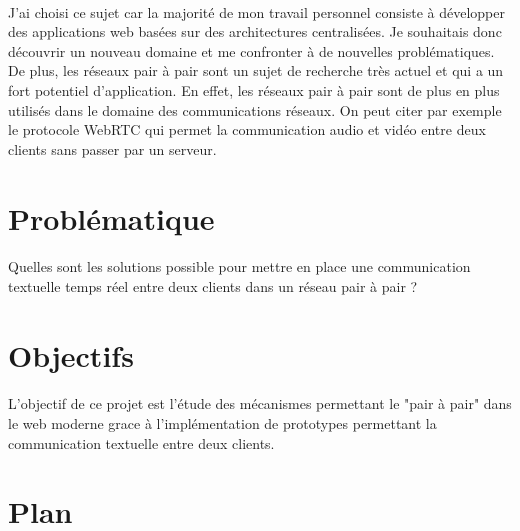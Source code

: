 \paragraph{}
J'ai choisi ce sujet car la majorité de mon travail personnel consiste à développer des applications web basées sur des architectures centralisées. Je souhaitais donc découvrir un nouveau
domaine et me confronter à de nouvelles problématiques. De plus, les réseaux pair à pair sont un sujet de recherche très actuel et qui a un fort potentiel d'application. En effet,
les réseaux pair à pair sont de plus en plus utilisés dans le domaine des communications réseaux. On peut citer par exemple le protocole WebRTC qui permet la communication audio et vidéo
entre deux clients sans passer par un serveur.


\section{Problématique}

\paragraph{}
Quelles sont les solutions possible pour mettre en place une communication textuelle temps réel entre deux clients dans un réseau pair à pair ?

\section{Objectifs}

\paragraph{}
L'objectif de ce projet est l'étude des mécanismes permettant le "pair à pair" dans le web moderne grace à l'implémentation de prototypes permettant la communication textuelle entre deux clients.

\section{Plan}

